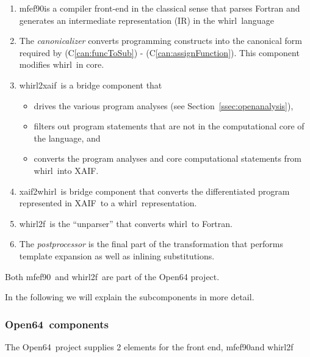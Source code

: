 \documentclass[acmtocl,acmnow]{acmtrans2m}
\newcommand{\mfefninety}{mfef90}
\newcommand{\OpenSixtyFour}{Open64}
\newcommand{\xaif}{XAIF}
\newcommand{\whirl}{whirl}
\newcommand{\whirlToxaif}{whirl2xaif}
\newcommand{\whirlTof}{whirl2f}
\newcommand{\xaifTowhirl}{xaif2whirl}
\newcommand{\refcan}[1]{(C\ref{#1})}
\newcommand{\refsec}[1]{Section~\ref{#1}}
\begin{document}
   \begin{enumerate}	
     \item \mfefninety is a compiler front-end in the classical sense that parses
       Fortran and generates an intermediate representation (IR)
       in the \whirl\ language

     \item The {\em canonicalizer} converts  
        programming constructs into the canonical form required by 
	\refcan{can:funcToSub} - \refcan{can:assignFunction}. 
	This component modifies \whirl\ in core.

     \item \whirlToxaif\ is a bridge component that
        \begin{itemize}
           \item drives the various program analyses (see \refsec{ssec:openanalysis}),
        
           \item filters out program statements that are not in the
                 computational core of the language, and 

           \item converts the program analyses and core computational
                 statements from \whirl\ into \xaif.
        \end{itemize}

     \item \xaifTowhirl\ is bridge component that converts the 
        differentiated program represented in \xaif\ 
        to a \whirl\ representation.

     \item \whirlTof\ is the ``unparser'' that converts \whirl\ to
        Fortran.

     \item The {\em postprocessor} is the  final part of the transformation that
        performs template expansion as well as inlining substitutions.

   \end{enumerate}

Both \mfefninety\ and \whirlTof\ are part of the Open64 project.

In the following we will explain the 
subcomponents in more detail. 

\subsubsection{\OpenSixtyFour\ components} \label{sssec:mfef}
The \OpenSixtyFour\ project supplies 2 elements for the front end, 
\mfefninety and \whirlTof
\end{document}
